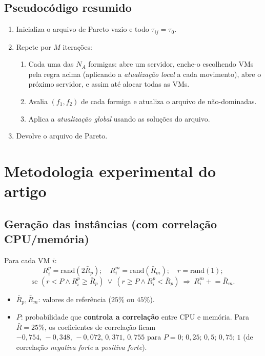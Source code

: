 \documentclass[11pt]{article}
\newcommand{\var}[1]{\textcolor{azul}{$#1$}}
\begin{document}
\subsection{Pseudocódigo resumido}
\begin{enumerate}[leftmargin=1.6em,itemsep=1pt]
  \item Inicializa o arquivo de Pareto vazio e todo $\tau_{ij}=\tau_0$.
  \item Repete por $M$ iterações:
  \begin{enumerate}[leftmargin=1.4em,itemsep=0pt]
    \item Cada uma das $N_A$ formigas: abre um servidor, enche-o escolhendo VMs
    pela regra acima (aplicando a \emph{atualização local} a cada movimento),
    abre o próximo servidor, e assim até alocar todas as VMs.
    \item Avalia $(f_1,f_2)$ de cada formiga e atualiza o arquivo de não-dominadas.
    \item Aplica a \emph{atualização global} usando as soluções do arquivo.
  \end{enumerate}
  \item Devolve o arquivo de Pareto.
\end{enumerate}

\section{Metodologia experimental do artigo}
\subsection{Geração das instâncias (com correlação CPU/memória)}
Para cada VM $i$:
\[
R^p_i=\text{rand}(2\bar{R}_p);\quad R^m_i=\text{rand}(\bar{R}_m);\quad r=\text{rand}(1);
\]
\[
\text{se } (r<P \wedge R^p_i\ge \bar{R}_p)\ \vee\ (r\ge P \wedge R^p_i<\bar{R}_p)\ \Rightarrow\ R^m_i\mathrel{+}=\bar{R}_m.
\]
\begin{itemize}[leftmargin=1.4em,itemsep=1pt]
  \item \var{\bar{R}_p,\bar{R}_m}: valores de referência ($25\%$ ou $45\%$).
  \item \var{P}: probabilidade que \textbf{controla a correlação} entre CPU e
  memória. Para $\bar{R}=25\%$, os coeficientes de correlação ficam
  $-0{,}754,\,-0{,}348,\,-0{,}072,\,0{,}371,\,0{,}755$ para
  $P=0;\,0{,}25;\,0{,}5;\,0{,}75;\,1$ (de correlação \emph{negativa forte} a
  \emph{positiva forte}).
\end{itemize}
\end{document}
